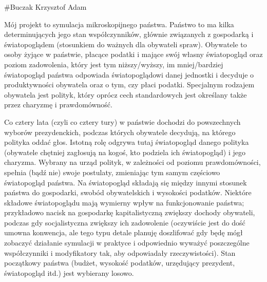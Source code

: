 \#\+Buczak Krzysztof Adam

Mój projekt to symulacja mikroskopijnego państwa. Państwo to ma kilka determinujących jego stan współczynników, głównie związanych z gospodarką i światopoglądem (stosunkiem do ważnych dla obywateli spraw). Obywatele to osoby żyjące w państwie, płacące podatki i mające swój własny światopogląd oraz poziom zadowolenia, który jest tym niższy/wyższy, im mniej/bardziej światopogląd państwa odpowiada światopoglądowi danej jednostki i decyduje o produktywności obywatela oraz o tym, czy płaci podatki. Specjalnym rodzajem obywatela jest polityk, który oprócz cech standardowych jest określany także przez charyzmę i prawdomówność.

Co cztery lata (czyli co cztery tury) w państwie dochodzi do powszechnych wyborów prezydenckich, podczas których obywatele decydują, na którego polityka oddać głos. Istotną rolę odgrywa tutaj światopogląd danego polityka (obywatele chętniej zagłosują na kogoś, kto podziela ich światopogląd) i jego charyzma. Wybrany na urząd polityk, w zależności od poziomu prawdomówności, spełnia (bądź nie) swoje postulaty, zmieniając tym samym częściowo światopogląd państwa. Na światopogląd składają się między innymi stosunek państwa do gospodarki, swobód obywatelskich i wysokości podatków. Niektóre składowe światopoglądu mają wymierny wpływ na funkcjonowanie państwa; przykładowo nacisk na gospodarkę kapitalistyczną zwiększy dochody obywateli, podczas gdy socjalistyczna zwiększy ich zadowolenie (oczywiście jest do dość umowna konwencja, ale tego typu detale planuję doszlifować gdy będę mógł zobaczyć działanie symulacji w praktyce i odpowiednio wyważyć poszczególne współczynniki i modyfikatory tak, aby odpowiadały rzeczywistości). Stan początkowy państwa (budżet, wysokość podatków, urzędujący prezydent, światopogląd itd.) jest wybierany losowo. 